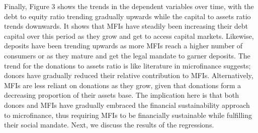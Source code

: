 \documentclass[a4paper,nobind]{templates/ociamthesis}
\begin{document}
Finally, Figure 3 shows the trends in the dependent variables over time, with the debt to equity ratio trending gradually upwards while the capital to assets ratio trends downwards. It shows that MFIs have steadily been increasing their debt capital over this period as they grow and get to access capital markets. Likewise, deposits have been trending upwards as more MFIs reach a higher number of consumers or as they mature and get the legal mandate to garner deposits. The trend for the donations to assets ratio is like literature in microfinance suggests; donors have gradually reduced their relative contribution to MFIs. Alternatively, MFIs are less reliant on donations as they grow, given that donations form a decreasing proportion of their assets base. The implication here is that both donors and MFIs have gradually embraced the financial sustainability approach to microfinance, thus requiring MFIs to be financially sustainable while fulfilling their social mandate. Next, we discuss the results of the regressions.
\end{document}

